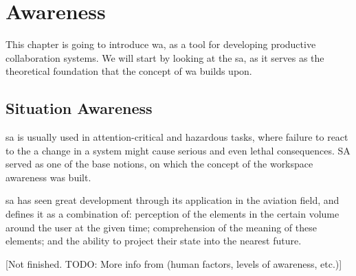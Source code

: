 
\chapter{Awareness}

This chapter is going to introduce \gls{wa}, as a tool for developing productive collaboration systems. We will start by looking at the \gls{sa}, as it serves as the theoretical foundation that the concept of \gls{wa} builds upon.


\section{Situation Awareness}

\gls{sa} is usually used in attention-critical and hazardous tasks, where failure to react to the a change in a system might cause serious and even lethal consequences. SA served as one of the base notions, on which the concept of the workspace awareness was built.

\gls{sa} has seen great development through its application in the aviation field, and \cite{endsley_situation_1988} defines it as a combination of: perception of the elements in the certain volume around the user at the given time; comprehension of the meaning of these elements; and the ability to project their state into the nearest future.

[Not finished. TODO: More info from \cite{endsley_situation_1988} (human factors, levels of awareness, etc.)]

